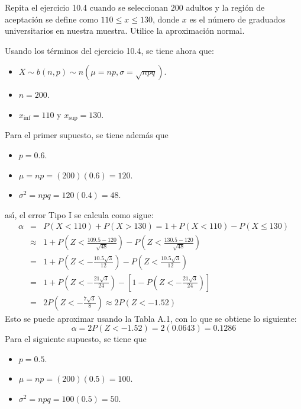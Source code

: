 \begin{enunciado}
 Repita el ejercicio 10.4 cuando se seleccionan $200$ adultos y la regi\'on de aceptaci\'on se define como $110 \leq x \leq 130$, donde $x$ es el n\'umero de graduados universitarios en nuestra muestra. Utilice la aproximaci\'on normal.
\end{enunciado}

\begin{solucion}
 Usando los t\'erminos del ejercicio 10.4, se tiene ahora que:
 \begin{itemize}
  \item $X \sim b(n,p) \sim n\left(\mu = np, \sigma = \sqrt{npq}\right)$.
  \item $n = 200$.
  \item $x_{\text{inf}} = 110$ y $x_{\text{sup}} = 130$.
 \end{itemize}
 Para el primer supuesto, se tiene adem\'as que
 \begin{itemize}
  \item $p = 0.6$.
  \item $\mu = np = (200)(0.6) = 120$.
  \item $\sigma^2 = npq = 120(0.4) = 48$.
 \end{itemize}
 as\'{\i}, el error Tipo I se calcula como sigue:
 \begin{eqnarray*}
  \alpha & = & P(X < 110) + P(X > 130) = 1 + P(X < 110) - P(X \leq 130) \\
  & \approx & 1 + P\left( Z < \frac{109.5-120}{\sqrt{48}} \right) - P\left(Z < \frac{130.5 - 120}{\sqrt{48}} \right) \\
  & = & 1 + P\left(Z < -\frac{10.5\sqrt{3}}{12} \right) - P\left(Z < \frac{10.5\sqrt{3}}{12} \right) \\
  & = & 1 + P\left(Z < -\frac{21\sqrt{3}}{24} \right) - \left[ 1 - P\left(Z < -\frac{21\sqrt{3}}{24} \right) \right] \\
  & = & 2P\left( Z < -\frac{7\sqrt{3}}{8} \right) \approx 2P(Z < -1.52)
 \end{eqnarray*}
 Esto se puede aproximar usando la Tabla A.1, con lo que se obtiene lo siguiente:
 \begin{equation*}
  \alpha = 2P(Z < -1.52) = 2(0.0643) = 0.1286
 \end{equation*}
 Para el siguiente supuesto, se tiene que
 \begin{itemize}
  \item $p = 0.5$.
  \item $\mu = np = (200)(0.5) = 100$.
  \item $\sigma^2 = npq = 100(0.5) = 50$.

\end{itemize}
\end{solucion}
